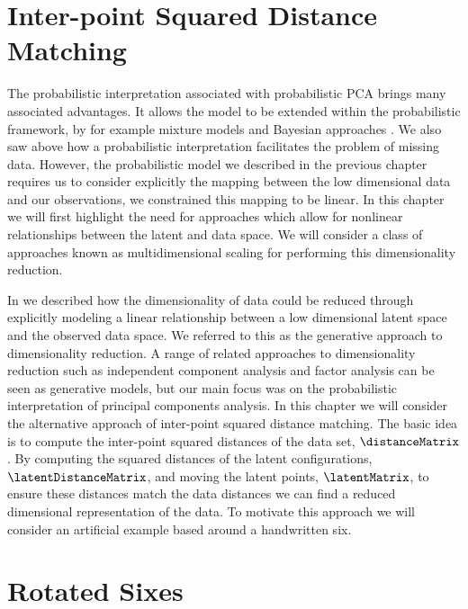 \section{Inter-point Squared Distance Matching}

The probabilistic interpretation associated with probabilistic
PCA brings many associated
advantages. It allows the model to be extended within the
probabilistic framework, by for example mixture models
\citep{Tipping:iee_mixpca97,Ghahramani:emmixtures97} and Bayesian approaches
\citep{Bishop:bayesPCA98,Bishop:icann99,Minka:automatic01}. We also saw above how a probabilistic interpretation
facilitates the problem of missing data. However, the probabilistic
model we described in the previous chapter requires us to consider
explicitly the mapping between the low dimensional data and our
observations, we constrained this mapping to be linear. In this
chapter we will first highlight the need for approaches which allow
for nonlinear relationships between the latent and data space. We will
consider a class of approaches known as multidimensional
scaling for performing this
dimensionality reduction.

In  we described how the dimensionality of data
could be reduced through explicitly modeling a linear relationship
between a low dimensional latent space and the observed data space. We
referred to this as the generative approach to dimensionality
reduction. A range of related approaches to dimensionality reduction
such as independent component analysis and factor analysis can
be seen as generative models, but our main focus was on the
probabilistic interpretation of principal components
analysis. In this chapter we will
consider the alternative approach of inter-point squared distance
matching. The basic idea is to compute the inter-point squared
distances of the data set, $\distanceMatrix$. By computing the squared
distances of the latent configurations, $\latentDistanceMatrix$, and
moving the latent points, $\latentMatrix$, to ensure these distances
match the data distances we can find a reduced dimensional
representation of the data. To motivate this approach we will consider
an artificial example based around a handwritten six.

\section{Rotated Sixes}\label{sec:roatedSixes}
 

